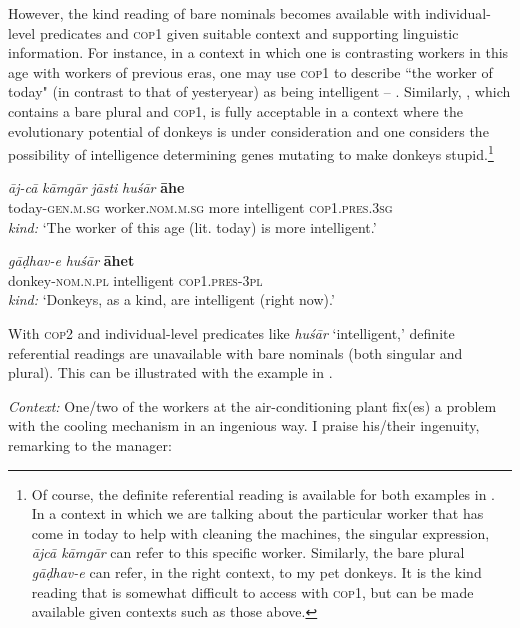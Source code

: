 \documentclass[output=paper,hidelinks]{langscibook}
\begin{document}
\begin{exe}
\begin{xlist}
\begin{xlist}
However, the kind reading of bare nominals becomes available with individual-level predicates and \textsc{cop1} given suitable context and supporting linguistic information. For instance, in a context in which one is contrasting workers in this age with workers of previous eras, one may use \textsc{cop1} to describe ``the worker of today" (in contrast to that of yesteryear) as being intelligent -- . Similarly, , which contains a bare plural and \textsc{cop1}, is fully acceptable in a context where the evolutionary potential of donkeys is under consideration and one considers the possibility of intelligence determining genes mutating to make donkeys stupid.\footnote{Of course, the definite referential reading is available for both examples in . In a context in which we are talking about the particular worker that has come in today to help with cleaning the machines, the singular expression, \emph{ājcā kāmgār} can refer to this specific worker. Similarly, the bare plural \emph{gāḍhav-e} can refer, in the right context, to my pet donkeys. It is the kind reading that is somewhat difficult to access with \textsc{cop1}, but can be made available given contexts such as those above.}

\ea \label{indworker1}
\ea
\gll \emph{āj-cā} \emph{kāmgār} \emph{jāsti} \emph{hu\'{s}ār} \textbf{{ā}he}\\
today-\textsc{gen.m.sg} worker.\textsc{nom.m.sg} more intelligent \textsc{cop1.pres.3sg}\\
\glt \emph{kind:} `The worker of this age (lit. today) is more intelligent.' \label{indworker1a}

\ex
\gll \emph{gāḍhav-e} \emph{hu\'{s}ār} \textbf{āhet}\\
donkey-\textsc{nom.n.pl} intelligent \textsc{cop1.pres-3pl}\\
\glt \emph{kind:} `Donkeys, as a kind, are intelligent (right now).' \label{indworker1b}
\z
\z
{}

With \textsc{cop2} and individual-level predicates like \emph{hu\'{s}ār} `intelligent,' definite referential readings are unavailable with bare nominals (both singular and plural). This can be illustrated with the example in .

\begin{exe}
 \ex \textit{Context:} One/two of the workers at the air-conditioning plant fix(es) a problem with the cooling mechanism in an ingenious way. I praise his/their ingenuity, remarking to the manager:


\end{exe}
\end{xlist}
\end{xlist}
\end{exe}
\end{document}
